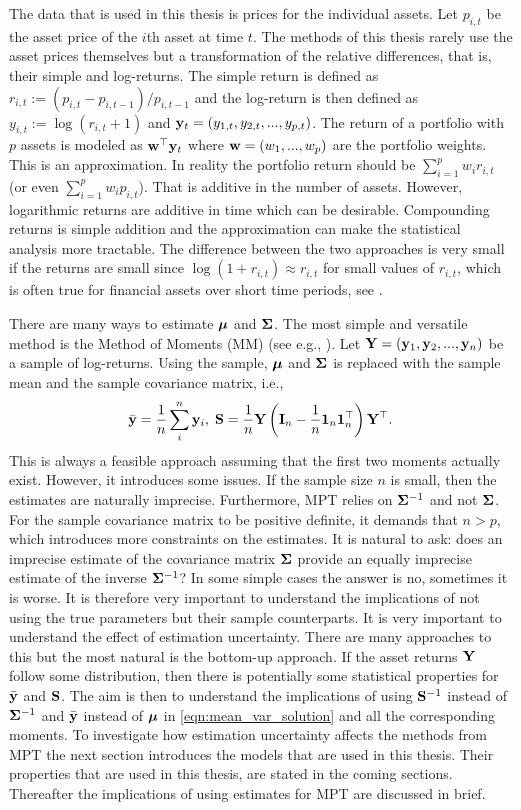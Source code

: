 \documentclass[12pt, oneside]{book}\usepackage{knitr}
\begin{document}
{The data that is used in this thesis is prices for the individual assets.
Let $p_{i,t}$ be the asset price of the $i$th asset at time $t$. 
The methods of this thesis rarely use the asset prices themselves but a transformation of the relative differences, that is, their simple and log-returns. 
The simple return is defined as $r_{i,t} := (p_{i,t}-p_{i,t-1})/p_{i,t-1}$ and the log-return is then defined as $y_{i,t} := \log(r_{i,t} + 1)$ and $\mathbf{y}_t=(y_{1,t},y_{2,t},..., y_{p,t})$.
The return of a portfolio with $p$ assets is modeled as $\mathbf{w}^\top \mathbf{y}_t$ where $\mathbf{w}=(w_1, ..., w_p)$ are the portfolio weights.
This is an approximation.
In reality the portfolio return should be $\sum_{i=1}^p w_i r_{i,t}$ (or even $\sum_{i=1}^p w_i p_{i,t}$). 
That is additive in the number of assets.
However, logarithmic returns are additive in time which can be desirable. 
Compounding returns is simple addition and the approximation can make the statistical analysis more tractable. 
The difference between the two approaches is very small if the returns are small since $\log(1+r_{i,t}) \approx r_{i,t}$ for small values of $r_{i,t}$, which is often true for financial assets over short time periods, see \citet[p. 5]{tsay2005analysis}. 

There are many ways to estimate $\mbox{\boldmath$\mu$}$ and $\mathbf{\Sigma}$.
The most simple and versatile method is the Method of Moments (MM) (see e.g., \citet[ch. 9]{wasserman2004all}). 
Let $\mathbf{Y} = (\mathbf{y}_1, \mathbf{y}_2, ..., \mathbf{y}_n)$ be a sample of log-returns.
Using the sample, $\mbox{\boldmath$\mu$}$ and $\mathbf{\Sigma}$ is replaced with the sample mean and the sample covariance matrix, i.e.,
$$
\bar{\mathbf{y}} = \frac{1}{n} \sum_i^n \mathbf{y}_i, \; \mathbf{S} = \frac{1}{n}\mathbf{Y} \left(\mathbf{I}_n - \frac{1}{n} \mathbf{1}_n \mathbf{1}_n^\top \right) \mathbf{Y}^\top.
$$
This is always a feasible approach assuming that the first two moments actually exist. 
However, it introduces some issues.
If the sample size $n$ is small, then the estimates are naturally imprecise.
Furthermore, MPT relies on $\mathbf{\Sigma}^{-1}$ and not $\mathbf{\Sigma}$.
For the sample covariance matrix to be positive definite, it demands that $n>p$, which introduces more constraints on the estimates.
It is natural to ask: does an imprecise estimate of the covariance matrix $\mathbf{\Sigma}$ provide an equally imprecise estimate of the inverse $\mathbf{\Sigma}^{-1}$?
In some simple cases the answer is no, sometimes it is worse. 
It is therefore very important to understand the implications of not using the true parameters but their sample counterparts.
It is very important to understand the effect of estimation uncertainty.
There are many approaches to this but the most natural is the bottom-up approach. 
If the asset returns $\mathbf{Y}$ follow some distribution, then there is potentially some statistical properties for $\bar{\mathbf{y}}$ and $\mathbf{S}$.
The aim is then to understand the implications of using $\mathbf{S}^{-1}$ instead of $\mathbf{\Sigma}^{-1}$ and $\bar{\mathbf{y}}$ instead of $\mbox{\boldmath$\mu$}$ in \eqref{eqn:mean_var_solution} and all the corresponding moments.
To investigate how estimation uncertainty affects the methods from MPT the next section introduces the models that are used in this thesis.
Their properties that are used in this thesis, are stated in the coming sections.
Thereafter the implications of using estimates for MPT are discussed in brief.

}
\end{document}
